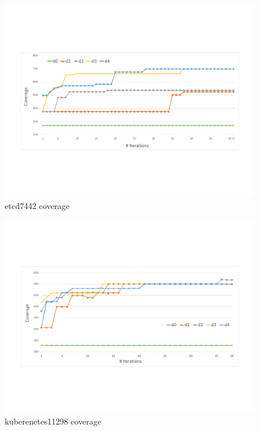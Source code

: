 \begin{figure}
\centering
  \includegraphics[width=.95\linewidth]{figs/coverage_etcd7443.pdf}
  \caption{etcd7442 coverage}
  \label{fig:etcd_coverage}
\end{figure}


\begin{figure}
\centering
  \includegraphics[width=.95\linewidth]{figs/coverage_kubernetes11298.pdf}
  \caption{kuberenetes11298 coverage}
  \label{fig:kubernetes_coverage}
\end{figure}
